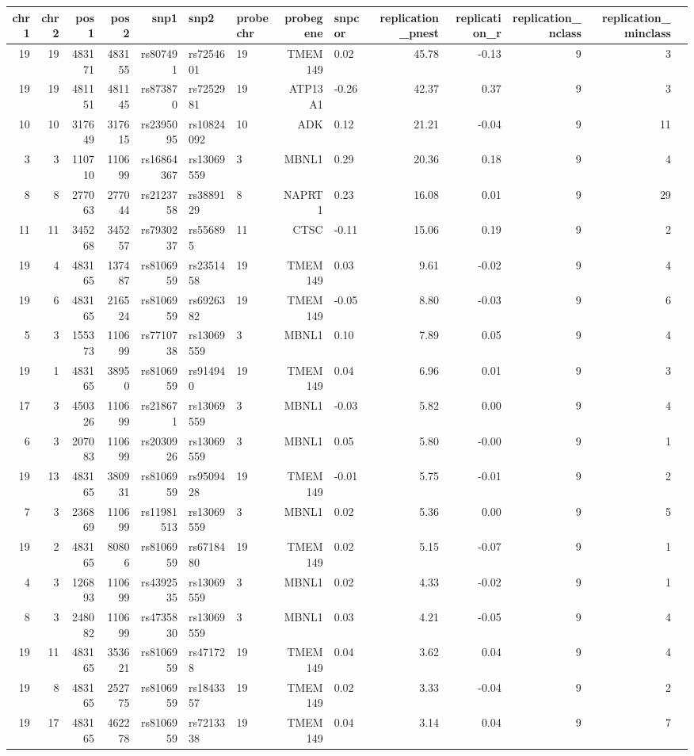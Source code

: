 \documentclass[paper=a4, fontsize=11pt]{scrartcl}	%
\numberwithin{equation}{section}									%
\numberwithin{figure}{section}										%
\numberwithin{table}{section}										%
\begin{document}
\begin{table}[ht]
\centering
\begin{tabular}{rrrrrllrlrrrrr}
  \hline
chr1 & chr2 & pos1 & pos2 & snp1 & snp2 & probechr & probegene & snpcor & replication\_pnest & replication\_r & replication\_nclass & replication\_minclass \\ 
  \hline
19 &  19 & 483171 & 483155 & rs807491 & rs7254601 &  19 & TMEM149 & 0.02 & 45.78 & -0.13 &   9 &   3 \\ 
19 &  19 & 481151 & 481145 & rs873870 & rs7252981 &  19 & ATP13A1 & -0.26 & 42.37 & 0.37 &   9 &   3 \\ 
10 &  10 & 317649 & 317615 & rs2395095 & rs10824092 &  10 & ADK & 0.12 & 21.21 & -0.04 &   9 &  11 \\ 
3 &   3 & 110710 & 110699 & rs16864367 & rs13069559 &   3 & MBNL1 & 0.29 & 20.36 & 0.18 &   9 &   4 \\ 
8 &   8 & 277063 & 277044 & rs2123758 & rs3889129 &   8 & NAPRT1 & 0.23 & 16.08 & 0.01 &   9 &  29 \\ 
11 &  11 & 345268 & 345257 & rs7930237 & rs556895 &  11 & CTSC & -0.11 & 15.06 & 0.19 &   9 &   2 \\ 
19 &   4 & 483165 & 137487 & rs8106959 & rs2351458 &  19 & TMEM149 & 0.03 & 9.61 & -0.02 &   9 &   4 \\ 
19 &   6 & 483165 & 216524 & rs8106959 & rs6926382 &  19 & TMEM149 & -0.05 & 8.80 & -0.03 &   9 &   6 \\ 
5 &   3 & 155373 & 110699 & rs7710738 & rs13069559 &   3 & MBNL1 & 0.10 & 7.89 & 0.05 &   9 &   4 \\ 
19 &   1 & 483165 & 38950 & rs8106959 & rs914940 &  19 & TMEM149 & 0.04 & 6.96 & 0.01 &   9 &   3 \\ 
17 &   3 & 450326 & 110699 & rs218671 & rs13069559 &   3 & MBNL1 & -0.03 & 5.82 & 0.00 &   9 &   4 \\ 
6 &   3 & 207083 & 110699 & rs2030926 & rs13069559 &   3 & MBNL1 & 0.05 & 5.80 & -0.00 &   9 &   1 \\ 
19 &  13 & 483165 & 380931 & rs8106959 & rs9509428 &  19 & TMEM149 & -0.01 & 5.75 & -0.01 &   9 &   2 \\ 
7 &   3 & 236869 & 110699 & rs11981513 & rs13069559 &   3 & MBNL1 & 0.02 & 5.36 & 0.00 &   9 &   5 \\ 
19 &   2 & 483165 & 80806 & rs8106959 & rs6718480 &  19 & TMEM149 & 0.02 & 5.15 & -0.07 &   9 &   1 \\ 
4 &   3 & 126893 & 110699 & rs4392535 & rs13069559 &   3 & MBNL1 & 0.02 & 4.33 & -0.02 &   9 &   1 \\ 
8 &   3 & 248082 & 110699 & rs4735830 & rs13069559 &   3 & MBNL1 & 0.03 & 4.21 & -0.05 &   9 &   4 \\ 
19 &  11 & 483165 & 353621 & rs8106959 & rs471728 &  19 & TMEM149 & 0.04 & 3.62 & 0.04 &   9 &   4 \\ 
19 &   8 & 483165 & 252775 & rs8106959 & rs1843357 &  19 & TMEM149 & 0.02 & 3.33 & -0.04 &   9 &   2 \\ 
19 &  17 & 483165 & 462278 & rs8106959 & rs7213338 &  19 & TMEM149 & 0.04 & 3.14 & 0.04 &   9 &   7 \\ 
   \hline
\end{tabular}
\end{table}
\end{document}
